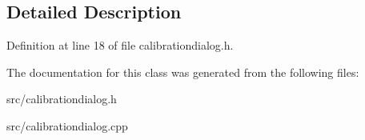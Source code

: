 \subsection{Detailed Description}


Definition at line 18 of file calibrationdialog.\+h.



The documentation for this class was generated from the following files\+:\begin{DoxyCompactItemize}
\item 
src/calibrationdialog.\+h\item 
src/calibrationdialog.\+cpp\end{DoxyCompactItemize}
